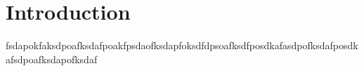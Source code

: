 \chapter{Introduction}
fsdapokfaksdpoafksdafpoakfpsdaofksdapfoksdfdpsoafksdfposdkafasdpofksdafposdkafsdpoafksdapofksdaf
